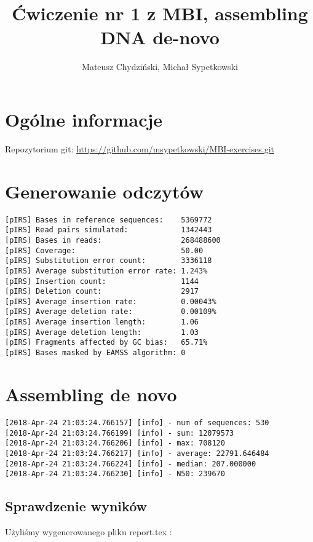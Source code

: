 \documentclass[a4paper]{article}
\begin{document}
\title{Ćwiczenie nr 1 z MBI, assembling DNA de-novo}
\author{Mateusz Chydziński, Michał Sypetkowski}
\maketitle

\section{Ogólne informacje}
Repozytorium git: \url{https://github.com/msypetkowski/MBI-exercises.git}


\section{Generowanie odczytów}
\begin{verbatim}
[pIRS] Bases in reference sequences:    5369772
[pIRS] Read pairs simulated:            1342443
[pIRS] Bases in reads:                  268488600
[pIRS] Coverage:                        50.00
[pIRS] Substitution error count:        3336118
[pIRS] Average substitution error rate: 1.243%
[pIRS] Insertion count:                 1144
[pIRS] Deletion count:                  2917
[pIRS] Average insertion rate:          0.00043%
[pIRS] Average deletion rate:           0.00109%
[pIRS] Average insertion length:        1.06
[pIRS] Average deletion length:         1.03
[pIRS] Fragments affected by GC bias:   65.71%
[pIRS] Bases masked by EAMSS algorithm: 0
\end{verbatim}

\section{Assembling de novo}

\begin{verbatim}
[2018-Apr-24 21:03:24.766157] [info] - num of sequences: 530
[2018-Apr-24 21:03:24.766199] [info] - sum: 12079573
[2018-Apr-24 21:03:24.766206] [info] - max: 708120
[2018-Apr-24 21:03:24.766217] [info] - average: 22791.646484
[2018-Apr-24 21:03:24.766224] [info] - median: 207.000000
[2018-Apr-24 21:03:24.766230] [info] - N50: 239670
\end{verbatim}


\subsection {Sprawdzenie wyników}

Użyliśmy wygenerowanego pliku report.tex :
\end{document}
